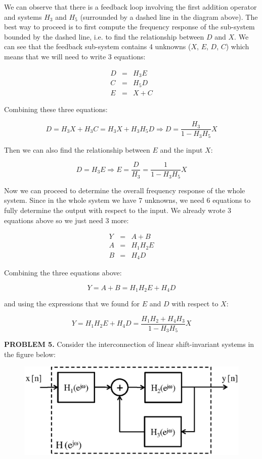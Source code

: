 \documentclass[a4paper,11pt,oneside]{article}
\begin{document}
We can observe that there is a feedback loop involving the first addition operator and systems $H_3$ and $H_5$ (surrounded by a dashed line in the diagram above). The best way to proceed is to first compute the frequency response of the sub-system bounded by the dashed line, i.e. to find the relationship between $D$ and  $X$. We can see that the feedback sub-system contains 4 unknowns ($X$, $E$, $D$, $C$) which means that we will need to write 3 equations:

\begin{eqnarray}
D &=&H_3E\label{eq:d}\\
C &=&H_5 D\label{eq:c}\\
E &=&X+C\label{eq:e}
\end{eqnarray}

Combining these three equations:

\[
D = H_3X + H_3C = H_3X+H_3H_5D\Rightarrow D = \frac{H_3}{1-H_3H_5}X
\]

Then we can also find the relationship between $E$ and the input $X$:

\[
D = H_3E \Rightarrow E=\frac{D}{H_3} =\frac{1}{1-H_3H_5}X
\]

Now we can proceed to determine the overall frequency response of the whole system. Since in the whole system we have 7 unknowns, we need 6 equations to fully determine the output with respect to the input. We already wrote 3 equations above so we just need 3 more:

\begin{eqnarray}
Y &=&A+B\\
A &=&H_1H_2E\\
B &=&H_4D
\end{eqnarray}

Combining the three equations above:

\[
Y = A+B=H_1H_2E+H_4D
\]

and using the expressions that we found for $E$ and $D$ with respect to $X$:

\[
Y =H_1H_2E+H_4D= \frac{H_1H_2+H_4H_3}{1-H_3H_5}X
\]


\vspace{1cm}




\textbf{PROBLEM 5.} Consider the interconnection of linear shift-invariant systems in the figure below:



\begin{figure}[h!]
\centering
\includegraphics[width=.7\textwidth]{fig5.eps}
\end{figure}
\end{document}
